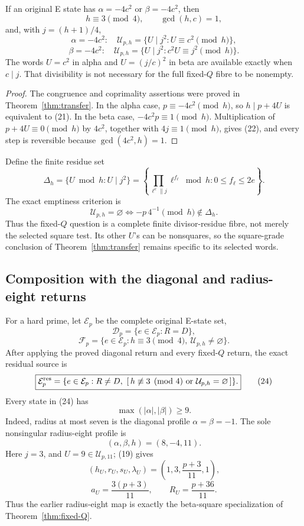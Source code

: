 \begin{corollary}
\label{cor:negative-square-slices}
If an original E state has \(\alpha=-4c^2\) or \(\beta=-4c^2\), then
\[
 h\equiv3\pmod4,\qquad\gcd(h,c)=1,
\]
and, with \(j=(h+1)/4\),
\[
 \alpha=-4c^2:\quad
 \mathcal U_{p,h}=\{U\mid j^2:U\equiv c^2\pmod h\},    \tag{21}
\]
\[
 \beta=-4c^2:\quad
 \mathcal U_{p,h}=\{U\mid j^2:c^2U\equiv j^2\pmod h\}. \tag{22}
\]
The words \(U=c^2\) in alpha and \(U=(j/c)^2\) in beta are available exactly
when \(c\mid j\).  That divisibility is not necessary for the full fixed-\(Q\)
fibre to be nonempty.
\end{corollary}

\begin{proof}
The congruence and coprimality assertions were proved in
Theorem~\ref{thm:transfer}.  In the alpha case,
\(p\equiv-4c^2\pmod h\), so
\(h\mid p+4U\) is equivalent to (21).  In the beta case,
\(-4c^2p\equiv1\pmod h\).  Multiplication of
\(p+4U\equiv0\pmod h\) by \(4c^2\), together with
\(4j\equiv1\pmod h\), gives (22), and every step is reversible because
\(\gcd(4c^2,h)=1\).
\end{proof}

Define the finite residue set
\[
 \Delta_h=\{U\bmod h:U\mid j^2\}
 =\left\{\prod_{\ell^e\parallel j}\ell^{f_\ell}\bmod h:
          0\le f_\ell\le2e\right\}.
\]
The exact emptiness criterion is
\[
 \boxed{\mathcal U_{p,h}=\varnothing
 \Longleftrightarrow -p\,4^{-1}\pmod h\notin\Delta_h.} \tag{23}
\]
Thus the fixed-\(Q\) question is a complete finite divisor-residue fibre, not
merely the selected square test.  Its other \(U\)'s can be nonsquares, so the
square-grade conclusion of Theorem~\ref{thm:transfer} remains specific to its
selected words.

\subsection{Composition with the diagonal and radius-eight returns}

For a hard prime, let \(\mathcal E_p\) be the complete original E-state set,
\[
 \mathcal D_p=\{e\in\mathcal E_p:R=D\},
\]
\[
 \mathcal F_p=\{e\in\mathcal E_p:
 h\equiv3\pmod4,\ \mathcal U_{p,h}\ne\varnothing\}.
\]
After applying the proved diagonal return and every fixed-\(Q\) return, the
exact residual source is
\[
 \boxed{
 \mathcal E_p^{\rm res}
 =\{e\in\mathcal E_p:R\ne D,\ 
 [\,h\not\equiv3\pmod4\ \text{or}\ \mathcal U_{p,h}=\varnothing\,]\}.} \tag{24}
\]
Every state in (24) has
\[
 \boxed{\max(|\alpha|,|\beta|)\ge9.}                   \tag{25}
\]
Indeed, radius at most seven is the diagonal profile
\(\alpha=\beta=-1\).  The sole nonsingular radius-eight profile is
\[
 (\alpha,\beta,h)=(8,-4,11).
\]
Here \(j=3\), and \(U=9\in\mathcal U_{p,11}\); (19) gives
\[
 (h_U,r_U,s_U,\lambda_U)
 =\left(1,3,\frac{p+3}{11},1\right),
\]
\[
 a_U=\frac{3(p+3)}{11},\qquad
 R_U=\frac{p+36}{11}.
\]
Thus the earlier radius-eight map is exactly the beta-square specialization
of Theorem~\ref{thm:fixed-Q}.

